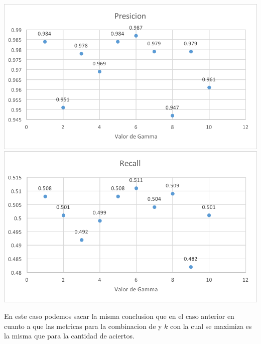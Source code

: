 \includegraphics[scale=1]{imagenes/plsdaPresicion.png}\\
\includegraphics[scale=1]{imagenes/plsdaRecall.png}

En este caso podemos sacar la misma conclusion que en el caso anterior en cuanto a que las metricas para la combinacion de \gamma y $k$ con la cual se maximiza es la misma que para la cantidad de aciertos. 

